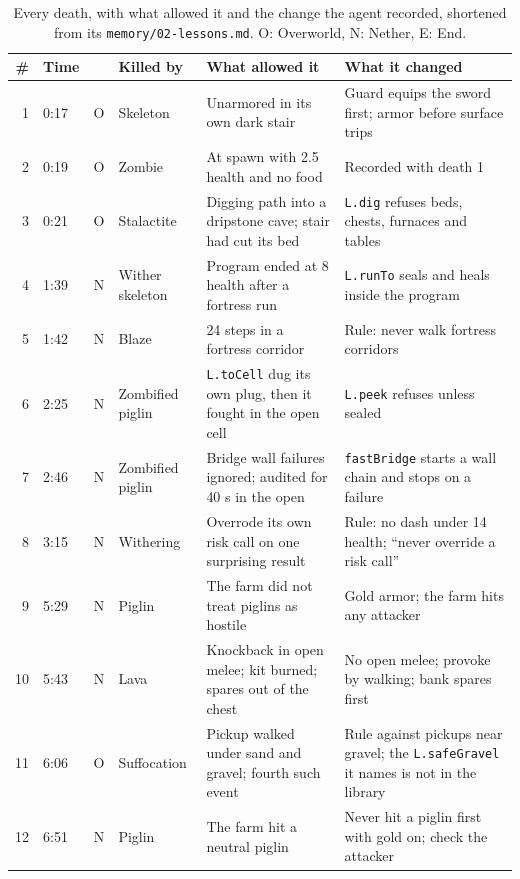 \documentclass[11pt,a4paper]{article}
\begin{document}
\begin{table}[t]
  \caption{Every death, with what allowed it and the change the agent recorded, shortened from its \texttt{memory/02-lessons.md}. O: Overworld, N: Nether, E: End.}
  \label{tab:deaths}
  \footnotesize
  \setlength{\tabcolsep}{4pt}
  \begin{tabularx}{\textwidth}{@{}rlclXX@{}}
    \toprule
    \textbf{\#} & \textbf{Time} & & \textbf{Killed by} & \textbf{What allowed it} & \textbf{What it changed} \\
    \midrule
    1 & 0:17 & O & Skeleton & Unarmored in its own dark stair & Guard equips the sword first; armor before surface trips \\
    2 & 0:19 & O & Zombie & At spawn with 2.5 health and no food & Recorded with death 1 \\
    3 & 0:21 & O & Stalactite & Digging path into a dripstone cave; stair had cut its bed & \texttt{L.dig} refuses beds, chests, furnaces and tables \\
    4 & 1:39 & N & Wither skeleton & Program ended at 8 health after a fortress run & \texttt{L.runTo} seals and heals inside the program \\
    5 & 1:42 & N & Blaze & 24 steps in a fortress corridor & Rule: never walk fortress corridors \\
    6 & 2:25 & N & Zombified piglin & \texttt{L.toCell} dug its own plug, then it fought in the open cell & \texttt{L.peek} refuses unless sealed \\
    7 & 2:46 & N & Zombified piglin & Bridge wall failures ignored; audited for 40 s in the open & \texttt{fastBridge} starts a wall chain and stops on a failure \\
    8 & 3:15 & N & Withering & Overrode its own risk call on one surprising result & Rule: no dash under 14 health; ``never override a risk call'' \\
    9 & 5:29 & N & Piglin & The farm did not treat piglins as hostile & Gold armor; the farm hits any attacker \\
    10 & 5:43 & N & Lava & Knockback in open melee; kit burned; spares out of the chest & No open melee; provoke by walking; bank spares first \\
    11 & 6:06 & O & Suffocation & Pickup walked under sand and gravel; fourth such event & Rule against pickups near gravel; the \texttt{L.safeGravel} it names is not in the library \\
    12 & 6:51 & N & Piglin & The farm hit a neutral piglin & Never hit a piglin first with gold on; check the attacker \\

\end{tabularx}
\end{table}
\end{document}
